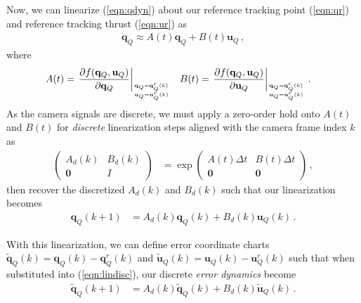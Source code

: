 \documentclass[11pt]{article}
\begin{document}
Now, we can linearize (\ref{eqn:qdyn}) about our reference tracking point (\ref{eqn:qr}) and reference tracking thrust (\ref{eqn:ur}) as
\begin{align}\label{eqn:linf}
    \dot{\mathbf q}_Q\approx A(t)\mathbf q_Q+B(t)\mathbf u_Q\,,
\end{align}
where
\begin{align*}
    A(t)&=\left.\frac{\partial f(\mathbf q_Q,\mathbf u_Q)}{\partial \mathbf q_Q}\right|_{\genfrac{}{}{0pt}{}{\mathbf q_Q=\mathbf q_Q^r(k)}{\mathbf u_Q=\mathbf u_Q^r(k)}} & B(t)&=\left.\frac{\partial f(\mathbf q_Q,\mathbf u_Q)}{\partial \mathbf u_Q}\right|_{\genfrac{}{}{0pt}{}{\mathbf q_Q=\mathbf q_Q^r(k)}{\mathbf u_Q=\mathbf u_Q^r(k)}}\,.
\end{align*}
As the camera signals are discrete, we must apply a zero-order hold onto $A(t)$ and $B(t)$ for \textit{discrete} linearization steps aligned with the camera frame index $k$ as
\begin{align*}
    \begin{pmatrix}
        A_d(k) & B_d(k)\\\mathbf 0 & I
    \end{pmatrix}&=\exp\begin{pmatrix}
        A(t)\Delta t & B(t)\Delta t\\\mathbf 0 & \mathbf 0
    \end{pmatrix}\,,
\end{align*}
then recover the discretized $A_d(k)$ and $B_d(k)$ such that our linearization becomes
\begin{align}\label{eqn:lindisc}
    \mathbf q_Q(k+1)&=A_d(k)\mathbf q_Q(k)+B_d(k)\mathbf u_Q(k)\,.
\end{align}

With this linearization, we can define error coordinate charts $\tilde{\mathbf q}_Q(k)=\mathbf q_Q(k)-\mathbf q_Q^r(k)$ and $\tilde{\mathbf u}_Q(k)=\mathbf u_Q(k)-\mathbf u_Q^r(k)$ such that when substituted into (\ref{eqn:lindisc}), our discrete \textit{error dynamics} become
\begin{align*}
    \tilde{\mathbf q}_Q(k+1)&=A_d(k)\tilde{\mathbf q}_Q(k)+B_d(k)\tilde{\mathbf u}_Q(k)\,.
\end{align*}
\end{document}
